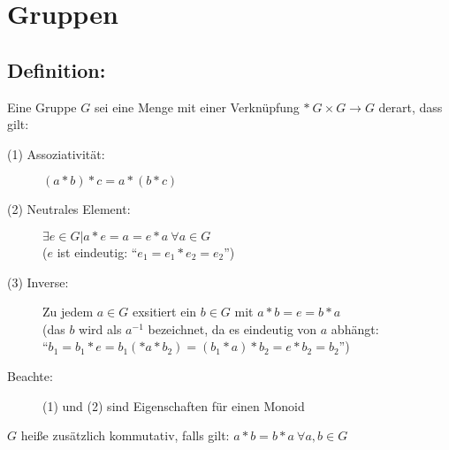 \section{Gruppen}
%
%
%
\subsection{Definition:}
Eine Gruppe $G$ sei eine Menge mit einer Verknüpfung $* \ G \times G \rightarrow G$ derart, dass gilt:\\
\begin{description}
	\item[(1) Assoziativität:] $(a*b)*c = a*(b*c)$
	\item[(2) Neutrales Element:] $\exists e \in G | a*e=a=e*a \ \forall a \in G$ \\
						($e$ ist eindeutig: "`$e_{1}=e_{1}*e_{2}=e_{2}$"')
	\item[(3) Inverse:] Zu jedem $a \in G$ exsitiert ein $b \in G$ mit $a*b=e=b*a$\\
				(das $b$ wird als $a^{-1}$ bezeichnet, da es eindeutig von $a$ abhängt: \\
				"`$b_{1} = b_{1}*e=b_{1}(*a*b_{2})=(b_{1}*a)*b_{2}=e*b_{2}=b_{2}$"')
	\item[Beachte:] (1) und (2) sind Eigenschaften für einen Monoid
\end{description}
$G$ heiße zusätzlich kommutativ, falls gilt: $a*b=b*a \ \forall a,b \in G$